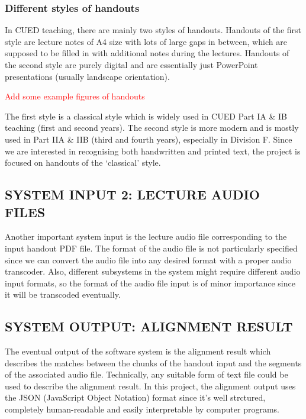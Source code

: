 \documentclass[12pt]{article}
\begin{document}
\subsubsection{Different styles of handouts}

In CUED teaching, there are mainly two styles of handouts. Handouts of the first style are lecture notes of A4 size with lots of large gaps in between, which are supposed to be filled in with additional notes during the lectures. Handouts of the second style are purely digital and are essentially just PowerPoint presentations (usually landscape orientation).

\textcolor{red}{Add some example figures of handouts}

The first style is a classical style which is widely used in CUED Part IA \& IB teaching (first and second years). The second style is more modern and is mostly used in Part IIA \& IIB (third and fourth years), especially in Division F. Since we are interested in recognising both handwritten and printed text, the project is focused on handouts of the `classical' style.

\subsection{SYSTEM INPUT 2: LECTURE AUDIO FILES}
\label{sec:input-audio}

Another important system input is the lecture audio file corresponding to the input handout PDF file. The format of the audio file is not particularly specified since we can convert the audio file into any desired format with a proper audio transcoder. Also, different subsystems in the system might require different audio input formats, so the format of the audio file input is of minor importance since it will be transcoded eventually. 

\subsection{SYSTEM OUTPUT: ALIGNMENT RESULT}
\label{sec:system-output}

The eventual output of the software system is the alignment result which describes the matches between the chunks of the handout input and the segments of the associated audio file. Technically, any suitable form of text file could be used to describe the alignment result. In this project, the alignment output uses the JSON (JavaScript Object Notation) format since it's well strctured, completely human-readable and easily interpretable by computer programs.
\end{document}
